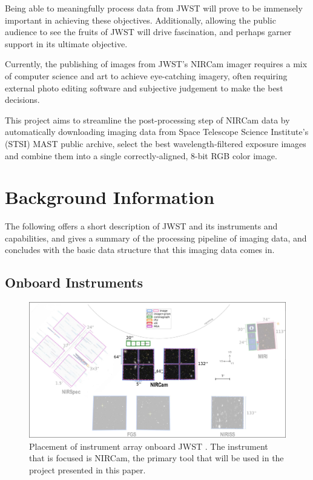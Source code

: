 \documentclass[10pt,twocolumn,letterpaper]{article}
\begin{document}
Being able to meaningfully process data from JWST will prove to be immensely important in achieving these objectives. Additionally, allowing the public audience to see the fruits of JWST will drive fascination, and perhaps garner support in its ultimate objective.

Currently, the publishing of images from JWST's NIRCam imager requires a mix of computer science and art to achieve eye-catching imagery, often requiring external photo editing software and subjective judgement to make the best decisions.

This project aims to streamline the post-processing step of NIRCam data by automatically downloading imaging data from Space Telescope Science Institute's (STSI) MAST public archive, select the best wavelength-filtered exposure images and combine them into a single correctly-aligned, 8-bit RGB color image.

\section{Background Information}
\label{sec:background}

The following offers a short description of JWST and its instruments and capabilities, and gives a summary of the processing pipeline of imaging data, and concludes with the basic data structure that this imaging data comes in.

\subsection{Onboard Instruments}

\begin{figure}
  \centering
    \includegraphics[scale=0.18]{instrument_array}
  \caption{Placement of instrument array onboard JWST \cite{webbnircam}. The instrument that is focused is NIRCam, the primary tool that will be used in the project presented in this paper.}
  \label{fig:instruments}
\end{figure}
\end{document}

